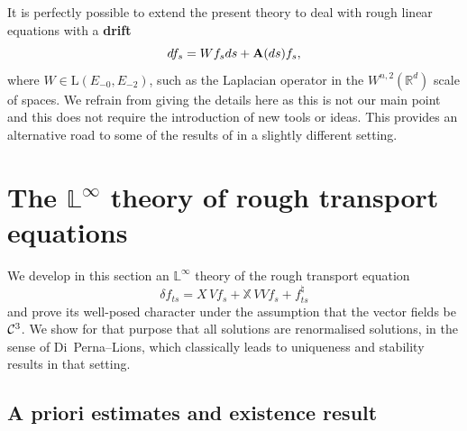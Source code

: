 \documentclass[11pt,a4paper]{amsart}
\newcommand{\RR}{\mathbb{R}}  \newcommand{\CC}{\mathbb{C}}  \newcommand{\LL}{\mathbb{L}}  \newcommand{\WW}{\mathbb{W}}
\newcommand{\bbX}{\mathbb{X}}
\theoremstyle{plain}%
\theoremstyle{definition}
\theoremstyle{remark}
\numberwithin{equation}{section} %
\begin{document}
\medskip

It is perfectly possible to extend the present theory to deal with rough linear equations with a {\bf drift}
$$
df_s = Wf_s ds + {\bf A}(ds)f_s,
$$
where $W\in\textrm{L}(E_{-0},E_{-2})$, such as the Laplacian operator in the $W^{n,2}(\RR^d)$ scale of spaces. We refrain from giving the details here as this is not our main point and this does not require the introduction of new tools or ideas. This provides an alternative road to some of the results of \cite{DiehlFrizStannat} in a slightly different setting.


\bigskip
 

\section{The $\LL^\infty$ theory of rough transport equations}
\label{SectionLInftyTheory}

We develop in this section an $\LL^\infty$ theory of the rough transport equation 
\begin{equation}
\label{EqTransportEq}
\delta f_{ts} = X\,Vf_s +  \bbX\,V V f_s + f^\natural_{ts}
\end{equation}  
and prove its well-posed character under the assumption that the vector fields be $\mathcal{C}^3$. We show for that purpose that all solutions are renormalised solutions, in the sense of Di~Perna--Lions, which classically leads to uniqueness and stability results in that setting. 

\medskip

\subsection{A priori estimates and existence result}
\label{SubsectionAPrioriEstimatesLInfty}
\end{document}
